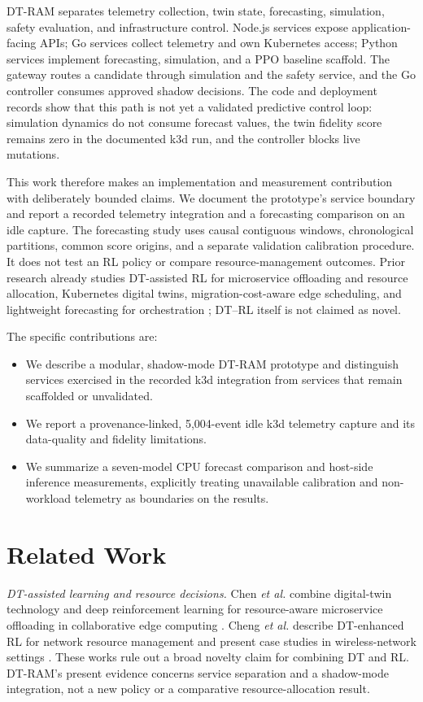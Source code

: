 \documentclass[conference]{IEEEtran}
\begin{document}
DT-RAM separates telemetry collection, twin state, forecasting, simulation, safety evaluation, and infrastructure control. Node.js services expose application-facing APIs; Go services collect telemetry and own Kubernetes access; Python services implement forecasting, simulation, and a PPO baseline scaffold. The gateway routes a candidate through simulation and the safety service, and the Go controller consumes approved shadow decisions. The code and deployment records show that this path is not yet a validated predictive control loop: simulation dynamics do not consume forecast values, the twin fidelity score remains zero in the documented k3d run, and the controller blocks live mutations.

This work therefore makes an implementation and measurement contribution with deliberately bounded claims. We document the prototype's service boundary and report a recorded telemetry integration and a forecasting comparison on an idle capture. The forecasting study uses causal contiguous windows, chronological partitions, common score origins, and a separate validation calibration procedure. It does not test an RL policy or compare resource-management outcomes. Prior research already studies DT-assisted RL for microservice offloading and resource allocation, Kubernetes digital twins, migration-cost-aware edge scheduling, and lightweight forecasting for orchestration \cite{chen2023,cheng2025,kubetwin2024,edgebus2024,aero2025}; DT--RL itself is not claimed as novel.

The specific contributions are:
\begin{itemize}
  \item We describe a modular, shadow-mode DT-RAM prototype and distinguish services exercised in the recorded k3d integration from services that remain scaffolded or unvalidated.
  \item We report a provenance-linked, 5,004-event idle k3d telemetry capture and its data-quality and fidelity limitations.
  \item We summarize a seven-model CPU forecast comparison and host-side inference measurements, explicitly treating unavailable calibration and non-workload telemetry as boundaries on the results.
\end{itemize}

\section{Related Work}
\textit{DT-assisted learning and resource decisions.} Chen \textit{et al.} combine digital-twin technology and deep reinforcement learning for resource-aware microservice offloading in collaborative edge computing \cite{chen2023}. Cheng \textit{et al.} describe DT-enhanced RL for network resource management and present case studies in wireless-network settings \cite{cheng2025}. These works rule out a broad novelty claim for combining DT and RL. DT-RAM's present evidence concerns service separation and a shadow-mode integration, not a new policy or a comparative resource-allocation result.
\end{document}
